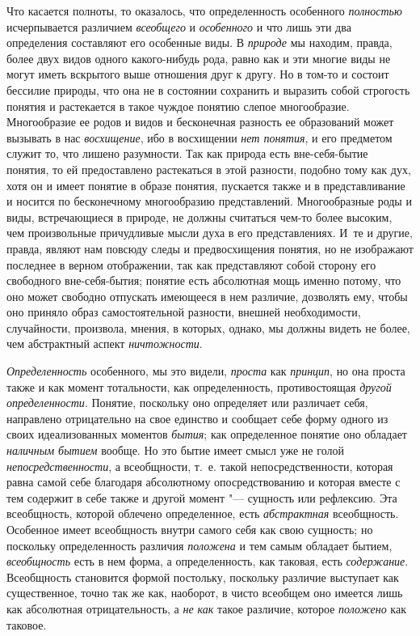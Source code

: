 {Что касается полноты, то оказалось, что определенность
особенного {\em полностью}
исчерпывается различием
{\em всеобщего} и
{\em особенного} и что
лишь эти два определения составляют его особенные виды. В
{\em природе} мы находим,
правда, более двух видов одного какого-нибудь рода, равно как и эти многие
виды не могут иметь вскрытого выше отношения друг к другу. Но в том-то и
состоит бессилие природы, что она не в состоянии сохранить и выразить собой
строгость понятия и растекается в такое чуждое понятию слепое многообразие.
Многообразие ее родов и видов и бесконечная разность ее образований может
вызывать в нас {\em восхищение},
ибо в восхищении {\em нет
понятия}, и его предметом служит то, что лишено разумности.
Так как природа есть вне-себя-бытие понятия, то ей предоставлено
растекаться в этой разности, подобно тому как дух, хотя он и имеет понятие
в образе понятия, пускается также и в представливание и носится по
бесконечному многообразию представлений. Многообразные роды и виды,
встречающиеся в природе, не должны считаться чем-то более высоким, чем
произвольные причудливые мысли духа в его представлениях. И~те и другие,
правда, являют нам повсюду следы и предвосхищения понятия, но не изображают
последнее в верном отображении, так как представляют собой сторону его
свободного вне-себя-бытия; понятие есть абсолютная мощь именно потому, что
оно может свободно отпускать имеющееся в нем различие, дозволять ему, чтобы
оно приняло образ самостоятельной разности, внешней необходимости,
случайности, произвола, мнения, в которых, однако, мы должны видеть не
более, чем абстрактный аспект
{\em ничтожности}.

{\em Определенность}
особенного, мы это видели,
{\em проста} как
{\em принцип}, но она
проста также и как момент тотальности, как определенность, противостоящая
{\em другой определенности}.
Понятие, поскольку оно определяет или различает себя,
направлено отрицательно на свое единство и сообщает себе форму одного из
своих идеализованных моментов
{\em бытия}; как
определенное понятие оно обладает
{\em наличным бытием}
вообще. Но это бытие имеет смысл уже не голой
{\em непосредственности},
а всеобщности, т.~е. такой непосредственности, которая равна
самой себе благодаря абсолютному опосредствованию и которая вместе с тем
содержит в себе также и другой момент "--- сущность или
рефлексию. Эта всеобщность, которой облечено определенное, есть
{\em абстрактная}
всеобщность. Особенное имеет всеобщность внутри самого себя
как свою сущность; но поскольку определенность различия
{\em положена} и тем
самым обладает бытием,
{\em всеобщность} есть в
нем форма, а определенность, как таковая, есть
{\em содержание}.
Всеобщность становится формой постольку, поскольку различие
выступает как существенное, точно так же как, наоборот, в чисто всеобщем
оно имеется лишь как абсолютная отрицательность, а
{\em не как} такое
различие, которое {\em положено}
как таковое.

}
